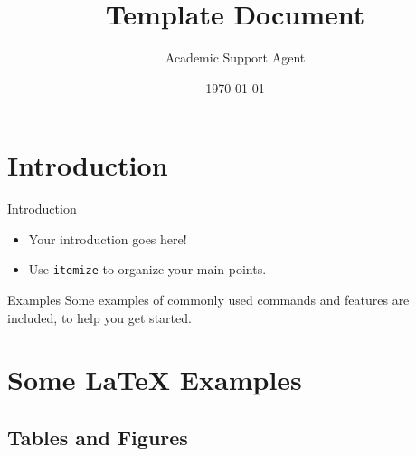 \documentclass{article}
\title{Template Document}
\author{Academic Support Agent}
\date{\today}
\begin{document}
\maketitle

\begin{frame}
  \titlepage
\end{frame}

%  

\section{Introduction}

\begin{frame}{Introduction}

\begin{itemize}
  \item Your introduction goes here!
  \item Use \texttt{itemize} to organize your main points.
\end{itemize}

\vskip 1cm

\begin{block}{Examples}
Some examples of commonly used commands and features are included, to help you get started.
\end{block}

\end{frame}

\section{Some \LaTeX{} Examples}

\subsection{Tables and Figures}
\end{document}
